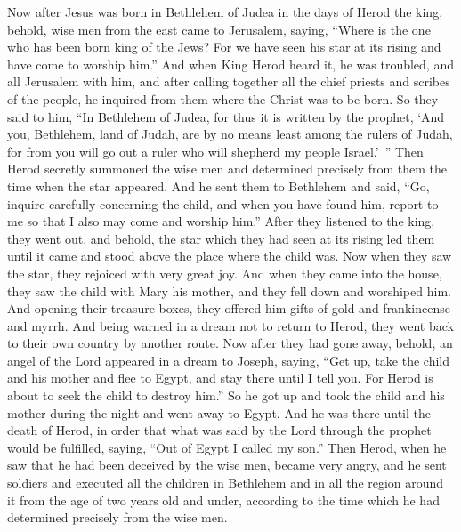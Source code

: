 \begin{biblechapter} %
 Now after Jesus was born in Bethlehem of Judea in the days of Herod the king, behold, wise men from the east came to Jerusalem,
\verse saying, “Where is the one who has been born king of the Jews? For we have seen his star at its rising and have come to worship him.”
\verse And when King Herod heard it, he was troubled, and all Jerusalem with him,
\verse and after calling together all the chief priests and scribes of the people, he inquired from them where the Christ was to be born.
\verse So they said to him, “In Bethlehem of Judea, for thus it is written by the prophet,
\verse ‘And you, Bethlehem, land of Judah, 
are by no means least among the rulers of Judah, 
for from you will go out a ruler 
who will shepherd my people Israel.’ ”
\verse Then Herod secretly summoned the wise men and determined precisely from them the time when the star appeared.
\verse And he sent them to Bethlehem and said, “Go, inquire carefully concerning the child, and when you have found him, report to me so that I also may come and worship him.”
\verse After they listened to the king, they went out, and behold, the star which they had seen at its rising led them until it came and stood above the place where the child was.
\verse Now when they saw the star, they rejoiced with very great joy.
\verse And when they came into the house, they saw the child with Mary his mother, and they fell down and worshiped him. And opening their treasure boxes, they offered him gifts of gold and frankincense and myrrh.
\verse And being warned in a dream not to return to Herod, they went back to their own country by another route.
 Now after they had gone away, behold, an angel of the Lord appeared in a dream to Joseph, saying, “Get up, take the child and his mother and flee to Egypt, and stay there until I tell you. For Herod is about to seek the child to destroy him.”
\verse So he got up and took the child and his mother during the night and went away to Egypt.
\verse And he was there until the death of Herod, in order that what was said by the Lord through the prophet would be fulfilled, saying, “Out of Egypt I called my son.”
 Then Herod, when he saw that he had been deceived by the wise men, became very angry, and he sent soldiers and executed all the children in Bethlehem and in all the region around it from the age of two years old and under, according to the time which he had determined precisely from the wise men.

\end{biblechapter}
